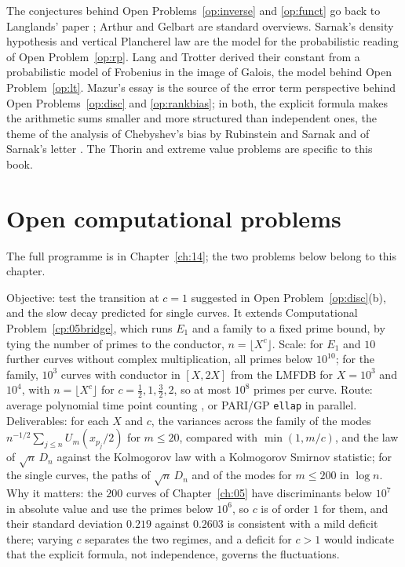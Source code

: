 The conjectures behind Open Problems~\ref{op:inverse} and \ref{op:funct} go back to Langlands' paper \cite{langlands1970}; Arthur \cite{arthur2003} and Gelbart \cite{gelbart1984} are standard overviews. Sarnak's density hypothesis and vertical Plancherel law \cite{sarnak1987,sarnakxue1991} are the model for the probabilistic reading of Open Problem~\ref{op:rp}. Lang and Trotter \cite{langtrotter1976} derived their constant from a probabilistic model of Frobenius in the image of Galois, the model behind Open Problem~\ref{op:lt}. Mazur's essay \cite{mazur2008} is the source of the error term perspective behind Open Problems~\ref{op:disc} and \ref{op:rankbias}; in both, the explicit formula makes the arithmetic sums smaller and more structured than independent ones, the theme of the analysis of Chebyshev's bias by Rubinstein and Sarnak \cite{rubinsteinsarnak1994} and of Sarnak's letter \cite{sarnak2007}. The Thorin and extreme value problems are specific to this book.

\section{Open computational problems}

The full programme is in Chapter~\ref{ch:14}; the two problems below belong to this chapter.

\begin{compproblem}\label{cp:13disc}
Objective: test the transition at $c=1$ suggested in Open Problem~\ref{op:disc}(b), and the slow decay predicted for single curves. It extends Computational Problem~\ref{cp:05bridge}, which runs $E_1$ and a family to a fixed prime bound, by tying the number of primes to the conductor, $n=\lfloor X^c\rfloor$. Scale: for $E_1$ and $10$ further curves without complex multiplication, all primes below $10^{10}$; for the family, $10^3$ curves with conductor in $[X,2X]$ from the LMFDB \cite{lmfdb} for $X=10^3$ and $10^4$, with $n=\lfloor X^c\rfloor$ for $c=\tfrac12,1,\tfrac32,2$, so at most $10^8$ primes per curve. Route: average polynomial time point counting \cite{harvey2014,harveysutherland2014}, or PARI/GP \texttt{ellap} in parallel. Deliverables: for each $X$ and $c$, the variances across the family of the modes $n^{-1/2}\sum_{j\le n}U_m(x_{p_j}/2)$ for $m\le20$, compared with $\min(1,m/c)$, and the law of $\sqrt n\,D_n$ against the Kolmogorov law with a Kolmogorov Smirnov statistic; for the single curves, the paths of $\sqrt n\,D_n$ and of the modes for $m\le200$ in $\log n$. Why it matters: the $200$ curves of Chapter~\ref{ch:05} have discriminants below $10^7$ in absolute value and use the primes below $10^6$, so $c$ is of order $1$ for them, and their standard deviation $0.219$ against $0.2603$ is consistent with a mild deficit there; varying $c$ separates the two regimes, and a deficit for $c>1$ would indicate that the explicit formula, not independence, governs the fluctuations.
\end{compproblem}

